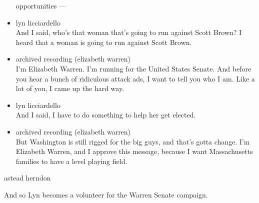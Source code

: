 \begin{itemize}
  opportunities ---
\item
  lyn licciardello\\
  And I said, who's that woman that's going to run against Scott Brown?
  I heard that a woman is going to run against Scott Brown.
\item
  archived recording (elizabeth warren)\\
  I'm Elizabeth Warren. I'm running for the United States Senate. And
  before you hear a bunch of ridiculous attack ads, I want to tell you
  who I am. Like a lot of you, I came up the hard way.
\item
  lyn licciardello\\
  And I said, I have to do something to help her get elected.
\item
  archived recording (elizabeth warren)\\
  But Washington is still rigged for the big guys, and that's gotta
  change. I'm Elizabeth Warren, and I approve this message, because I
  want Massachusetts families to have a level playing field.
\end{itemize}

astead herndon

And so Lyn becomes a volunteer for the Warren Senate campaign.

